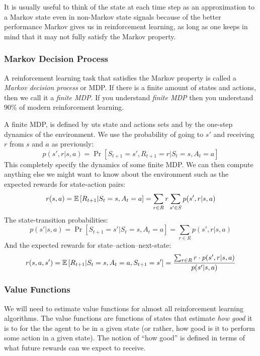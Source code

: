     It is usually useful to think of the state at each time step as an 
    approximation to a Markov state even in non-Markov state signals because of 
    the better performance Markov gives us in reinforcement learning, as long 
    as one keeps in mind that it may not fully satisfy the Markov property.
    
    \subsubsection{Markov Decision Process}
    A reinforcement learning task that satisfies the Markov property is called 
    a \textit{Markov decision process} or MDP. If there is a finite amount of 
    states and actions, then we call it a \textit{finite MDP}. If you 
    understand \textit{finite MDP} then you understand $90\%$ of modern 
    reinforcement learning.
    
    A finite MDP, is defined by uts state and actions sets and by the one-step 
    dynamics of the environment. We use the probability of going to $s'$ and 
    receiving $r$ from $s$ and $a$ as previously:
    \begin{equation*}
    p(s',r|s,a)=\Pr\left[S_{t+1}=s',R_{t+1}=r|S_t=s, A_t=a\right]
    \end{equation*}
    This completely specify the dynamics of some finite MDP. We can then 
    compute anything else we might want to know about the environment such as 
    the expected rewards for state-action pairs:
    \begin{equation*}
        r(s,a)=\mathbb{E}\left[R_{t+1}|S_t=s, A_t=a\right]=\sum_{r\in R}r \sum_{s' \in 
        S} p(s',r|s,a)
    \end{equation*}
    The state-transition probabilities:
    \begin{equation*}
        p(s'|s,a)=\Pr\left[S_{t+1}=s'|S_t=s, A_t=a\right]=\sum_{r\in 
        R}p(s',r|s,a)
    \end{equation*}
    And the expected rewards for state--action--next-state:
    \begin{equation*}
        r(s,a,s')=\mathbb{E}\left[R_{t+1}|S_t=s,A_t=a,S_{t+1}=s'\right]=\frac{\sum_{r\in
         R}r\cdot p(s',r|s,a)}{p(s'|s,a)}
    \end{equation*}
    
    \subsubsection{Value Functions}
    We will need to estimate value functions for almost all reinforcement 
    learning algorithms. The value functions are functions of states that 
    estimate \textit{how good} it is to for the the agent to be in a given 
    state (or rather, how good is it to perform some action in a given state). 
    The notion of ``how good'' is defined in terms of what future rewards can 
    we expect to receive.
    
